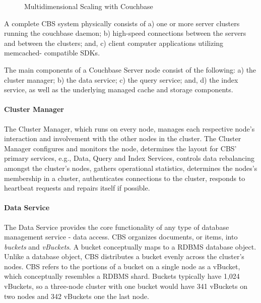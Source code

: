 \documentclass[9pt,twocolumn,twoside]{styles/osajnl}
\begin{document}
\begin{figure}[htbp]
\centering
{}
\caption{Multidimensional Scaling with Couchbase \cite{www-components-cbsinc}}
\label{fig:multidim scaling}
\end{figure}

A complete CBS system physically consists of a) one or more server clusters
running the couchbase daemon; b) high-speed connections between the servers and
between the clusters; and, c) client computer applications utilizing memcached-
compatible SDKs.  

The main components of a Couchbase Server node consist of the following: a) the
cluster manager; b) the data service; c) the query service; and, d) the index
service, as well as the underlying managed cache and storage components.\cite
{www-components-cbsinc}

\paragraph{Cluster Manager} The Cluster Manager, which runs on every node,
manages each respective node's interaction and involvement with the other nodes
in the cluster.  The Cluster Manager configures and monitors the node,
determines the layout for CBS' primary services, e.g., Data, Query and Index
Services, controls data rebalancing amongst the cluster's nodes, gathers
operational statistics, determines the nodes's membership in a cluster,
authenticates connections to the cluster, responds to heartbeat requests and
repairs itself if possible. 
\cite{www-clustermanager-cbsinc,www-components-cbsinc}

\paragraph{Data Service} The Data Service provides the core functionality of any type of database management service - data access.  CBS organizes documents, or items, into \textit{buckets} and \textit{vBuckets}.  A bucket conceptually maps to a RDBMS database object.  Unlike a database object, CBS distributes a bucket evenly across the cluster's nodes.  CBS refers to the portions of a bucket on a single node as a vBucket, which conceptually resembles a RDBMS shard.  Buckets typically have 1,024 vBuckets, so a three-node cluster with one bucket would have 341 vBuckets on two nodes and 342 vBuckets one the last node.  
\end{document}
